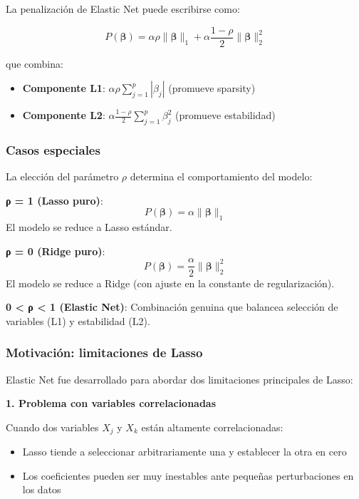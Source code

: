 \documentclass[
  doc,
  floatsintext,
  longtable,
  a4paper,
  nolmodern,
  notxfonts,
  notimes,
  12pt,
  colorlinks=true,linkcolor=blue,citecolor=blue,urlcolor=blue]{apa7}
\providecommand{\tightlist}{%
  \setlength{\itemsep}{0pt}\setlength{\parskip}{0pt}}
\begin{document}
La penalización de Elastic Net puede escribirse como:

\[
P(\boldsymbol{\beta}) = \alpha \rho \|\boldsymbol{\beta}\|_1 + \alpha \frac{1-\rho}{2} \|\boldsymbol{\beta}\|_2^2
\]

que combina:

\begin{itemize}
\tightlist
\item
  \textbf{Componente L1}: \(\alpha \rho \sum_{j=1}^{p} |\beta_j|\)
  (promueve sparsity)
\item
  \textbf{Componente L2}:
  \(\alpha \frac{1-\rho}{2} \sum_{j=1}^{p} \beta_j^2\) (promueve
  estabilidad)
\end{itemize}

\subsubsection{Casos especiales}\label{casos-especiales}

La elección del parámetro \(\rho\) determina el comportamiento del
modelo:

\textbf{ρ = 1 (Lasso puro)}: \[
P(\boldsymbol{\beta}) = \alpha \|\boldsymbol{\beta}\|_1
\] El modelo se reduce a Lasso estándar.

\textbf{ρ = 0 (Ridge puro)}: \[
P(\boldsymbol{\beta}) = \frac{\alpha}{2} \|\boldsymbol{\beta}\|_2^2
\] El modelo se reduce a Ridge (con ajuste en la constante de
regularización).

\textbf{0 \textless{} ρ \textless{} 1 (Elastic Net)}: Combinación
genuina que balancea selección de variables (L1) y estabilidad (L2).

\subsubsection{Motivación: limitaciones de
Lasso}\label{motivaciuxf3n-limitaciones-de-lasso}

Elastic Net fue desarrollado para abordar dos limitaciones principales
de Lasso:

\textbf{1. Problema con variables correlacionadas}

Cuando dos variables \(X_j\) y \(X_k\) están altamente correlacionadas:

\begin{itemize}
\tightlist
\item
  Lasso tiende a seleccionar arbitrariamente una y establecer la otra en
  cero
\item
  Los coeficientes pueden ser muy inestables ante pequeñas
  perturbaciones en los datos
\end{itemize}
\end{document}
